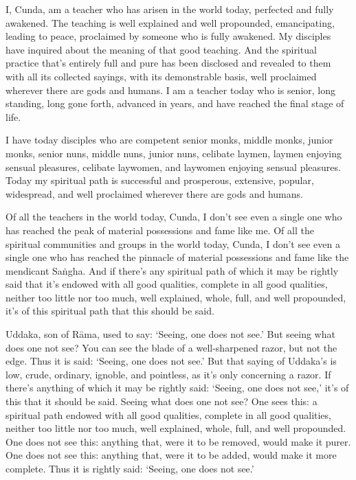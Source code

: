 \documentclass[12pt,openany]{book}%
\begin{document}
I, Cunda, am a teacher who has arisen in the world today, perfected and fully awakened. The teaching is well explained and well propounded, emancipating, leading to peace, proclaimed by someone who is fully awakened. My disciples have inquired about the meaning of that good teaching. And the spiritual practice that’s entirely full and pure has been disclosed and revealed to them with all its collected sayings, with its demonstrable basis, well proclaimed wherever there are gods and humans. I am a teacher today who is senior, long standing, long gone forth, advanced in years, and have reached the final stage of life. 

I have today disciples who are competent senior monks, middle monks, junior monks, senior nuns, middle nuns, junior nuns, celibate laymen, laymen enjoying sensual pleasures, celibate laywomen, and laywomen enjoying sensual pleasures. Today my spiritual path is successful and prosperous, extensive, popular, widespread, and well proclaimed wherever there are gods and humans. 

Of all the teachers in the world today, Cunda, I don’t see even a single one who has reached the peak of material possessions and fame like me. Of all the spiritual communities and groups in the world today, Cunda, I don’t see even a single one who has reached the pinnacle of material possessions and fame like the mendicant \textsanskrit{Saṅgha}. And if there’s any spiritual path of which it may be rightly said that it’s endowed with all good qualities, complete in all good qualities, neither too little nor too much, well explained, whole, full, and well propounded, it’s of this spiritual path that this should be said. 

Uddaka, son of \textsanskrit{Rāma}, used to say: ‘Seeing, one does not see.’ But seeing what does one not see? You can see the blade of a well-sharpened razor, but not the edge. Thus it is said: ‘Seeing, one does not see.’ But that saying of Uddaka’s is low, crude, ordinary, ignoble, and pointless, as it’s only concerning a razor. If there’s anything of which it may be rightly said: ‘Seeing, one does not see,’ it’s of this that it should be said. Seeing what does one not see? One sees this: a spiritual path endowed with all good qualities, complete in all good qualities, neither too little nor too much, well explained, whole, full, and well propounded. One does not see this: anything that, were it to be removed, would make it purer. One does not see this: anything that, were it to be added, would make it more complete. Thus it is rightly said: ‘Seeing, one does not see.’ 
\end{document}

